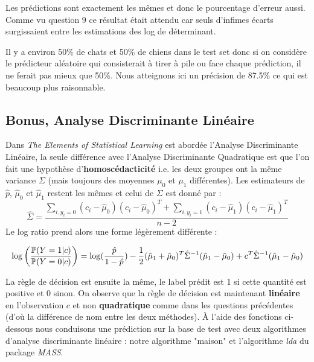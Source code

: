 \documentclass[10pt,a4paper]{report}\usepackage[]{graphicx}\usepackage[]{color}
\begin{document}
Les prédictions sont exactement les mêmes et donc le pourcentage d'erreur aussi. Comme vu question 9 ce résultat était attendu car seuls d'infimes écarts surgissaient entre les estimations des log de déterminant. 

Il y a environ 50\% de chats et 50\% de chiens dans le test set donc si on considère le prédicteur aléatoire qui consisterait à tirer à pile ou face chaque prédiction, il ne ferait pas mieux que 50\%. Nous atteignons ici un précision de 87.5\% ce qui est beaucoup plus raisonnable.

\subsection{Bonus, Analyse Discriminante Linéaire}

Dans \emph{The Elements of Statistical Learning} est abordée l'Analyse Discriminante Linéaire, la seule différence avec l'Analyse Discriminante Quadratique est que l'on fait une hypothèse d'\textbf{homoscédacticité} i.e. les deux groupes ont la même variance $\Sigma$ (mais toujours des moyennes $\mu_0$ et $\mu_1$ différentes). Les estimateurs de $\hat{p}$, $\hat{\mu}_0$ et $\hat{\mu}_1$ restent les mêmes et celui de $\Sigma$ est donné par : \[\hat{\Sigma} =  \frac{\sum_{i,y_i=0}(c_i-\hat{\mu}_0)(c_i-\hat{\mu}_0)^T + \sum_{i,y_i=1}(c_i-\hat{\mu}_1)(c_i-\hat{\mu}_1)^T}{n-2} \] 
Le log ratio prend alors une forme légèrement différente : 

\[\log \bigg{(}\frac{\mathbb{P} (Y=1| c)}{\mathbb{P} (Y=0| c)} \bigg{)} = \log(\frac{\hat{p}}{1-\hat{p}}) - \frac{1}{2}(\hat{\mu}_1 + \hat{\mu}_0)^T\hat{\Sigma}^{-1}(\hat{\mu}_1 - \hat{\mu}_0) + c^T \hat{\Sigma}^{-1}(\hat{\mu}_1 - \hat{\mu}_0)\]

La règle de décision est ensuite la même, le label prédit est 1 si cette quantité est positive et 0 sinon. On observe que la règle de décision est maintenant \textbf{linéaire} en l'observation $c$ et non \textbf{quadratique} comme dans les questions précédentes (d'où la différence de nom entre les deux méthodes). À l'aide des fonctions ci-dessous nous conduisons une prédiction sur la base de test avec deux algorithmes d'analyse discriminante linéaire : notre algorithme "maison" et l'algorithme \emph{lda} du package \emph{MASS}.  
\end{document}
